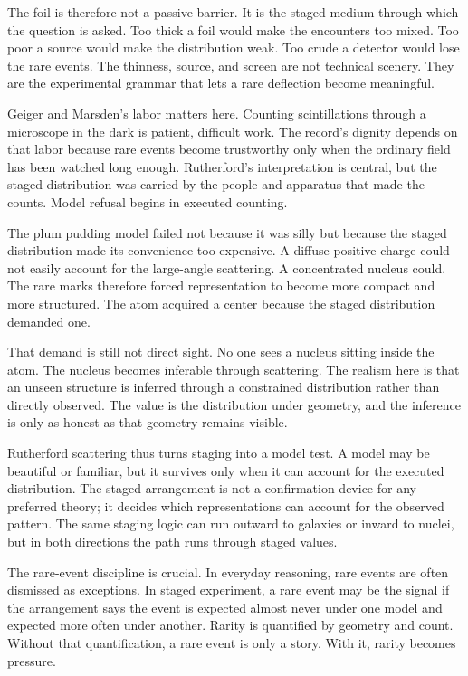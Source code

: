 The foil is therefore not a passive barrier. It is the staged medium
through which the question is asked. Too thick a foil would make the
encounters too mixed. Too poor a source would make the distribution weak.
Too crude a detector would lose the rare events. The thinness, source, and
screen are not technical scenery. They are the experimental grammar that
lets a rare deflection become meaningful.

Geiger and Marsden's labor matters here. Counting scintillations through a
microscope in the dark is patient, difficult work. The record's dignity
depends on that labor because rare events become trustworthy only when the
ordinary field has been watched long enough. Rutherford's interpretation is
central, but the staged distribution was carried by the people and
apparatus that made the counts. Model refusal begins in executed counting.

The plum pudding model failed not because it was silly but because the
staged distribution made its convenience too expensive. A diffuse positive
charge could not easily account for the large-angle scattering. A
concentrated nucleus could. The rare marks therefore forced representation
to become more compact and more structured. The atom acquired a center
because the staged distribution demanded one.

That demand is still not direct sight. No one sees a nucleus sitting inside
the atom. The nucleus becomes inferable through scattering. The realism
here is that an unseen structure is inferred through a constrained
distribution rather than directly observed. The value is the distribution
under geometry, and the inference is only as honest as that geometry
remains visible.

Rutherford scattering thus turns staging into a model test. A model may be
beautiful or familiar, but it survives only when it can account for the
executed distribution. The staged arrangement is not a confirmation device
for any preferred theory; it decides which representations can account for
the observed pattern. The same staging logic can run outward to galaxies or
inward to nuclei, but in both directions the path runs through staged
values.

The rare-event discipline is crucial. In everyday reasoning, rare events
are often dismissed as exceptions. In staged experiment, a rare event may
be the signal if the arrangement says the event is expected almost never
under one model and expected more often under another. Rarity is
quantified by geometry and count. Without that quantification, a rare event
is only a story. With it, rarity becomes pressure.

